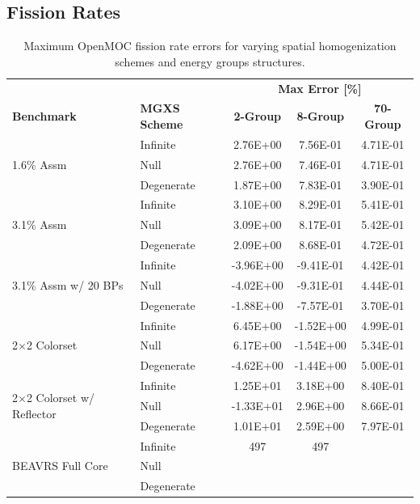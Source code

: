 \subsection{Fission Rates}
\label{subsec:chap8-fiss-rates}

\begin{table}[h!]
  \centering
  \caption[Maximum OpenMOC fission rate errors]{Maximum OpenMOC fission rate errors for varying spatial homogenization schemes and energy groups structures.}
  \small
  \label{table:chap8-openmoc-max-fiss-rates}
  \vspace{6pt}
  \begin{tabular}{l l c c c}
  \toprule
  \rowcolor{lightgray}
  & & \multicolumn{3}{c}{\cellcolor{lightgray} \textbf{Max Error [\%]}} \\
  \multirow{-2}{*}{\cellcolor{lightgray} \bf Benchmark} &
  \multirow{-2}{*}{\cellcolor{lightgray} \bf \ac{MGXS} Scheme} &
  {\cellcolor{lightgray} \bf 2-Group} &
  {\cellcolor{lightgray} \bf 8-Group} &
  {\cellcolor{lightgray} \bf 70-Group} \\
  \midrule
\multirow{3}{*}{\parbox{2.5cm}{1.6\% Assm}} & Infinite & 2.76E+00 & 7.56E-01 & 4.71E-01 \\
& Null & 2.76E+00 & 7.46E-01 & 4.71E-01 \\
& Degenerate & 1.87E+00 & 7.83E-01 & 3.90E-01 \\
  \midrule
\multirow{3}{*}{\parbox{2.5cm}{3.1\% Assm}} & Infinite & 3.10E+00 & 8.29E-01 & 5.41E-01 \\
& Null & 3.09E+00 & 8.17E-01 & 5.42E-01 \\
& Degenerate & 2.09E+00 & 8.68E-01 & 4.72E-01 \\
  \midrule
\multirow{3}{*}{\parbox{2.5cm}{3.1\% Assm w/ 20 BPs}} & Infinite & -3.96E+00 & -9.41E-01 & 4.42E-01 \\
& Null & -4.02E+00 & -9.31E-01 & 4.44E-01 \\
& Degenerate & -1.88E+00 & -7.57E-01 & 3.70E-01 \\
  \midrule
\multirow{3}{*}{\parbox{2.5cm}{2$\times$2 Colorset}} & Infinite & 6.45E+00 & -1.52E+00 & 4.99E-01 \\
& Null & 6.17E+00 & -1.54E+00 & 5.34E-01 \\
& Degenerate & -4.62E+00 & -1.44E+00 & 5.00E-01 \\
  \midrule
\multirow{3}{*}{\parbox{2.5cm}{2$\times$2 Colorset w/ Reflector}} & Infinite & 1.25E+01 & 3.18E+00 & 8.40E-01 \\
& Null & -1.33E+01 & 2.96E+00 & 8.66E-01 \\
& Degenerate & 1.01E+01 & 2.59E+00 & 7.97E-01 \\
  \midrule
  \multirow{3}{*}{\parbox{2cm}{\ac{BEAVRS} Full Core}} & Infinite & 497 & 497 & \\
  & Null & & & \\
  & Degenerate & & & \\
  \bottomrule
\end{tabular}
\end{table}

